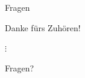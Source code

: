 \documentclass[EU2]{beamer}
\begin{document}
\section*{}

\begin{frame}{Fragen}
  \begin{center}
    \Large{Danke fürs Zuhören!}
  \end{center}
  \begin{center}
    $\vdots$
  \end{center}
  \begin{center}
    \Large{Fragen?}
  \end{center}
\end{frame}
\end{document}

